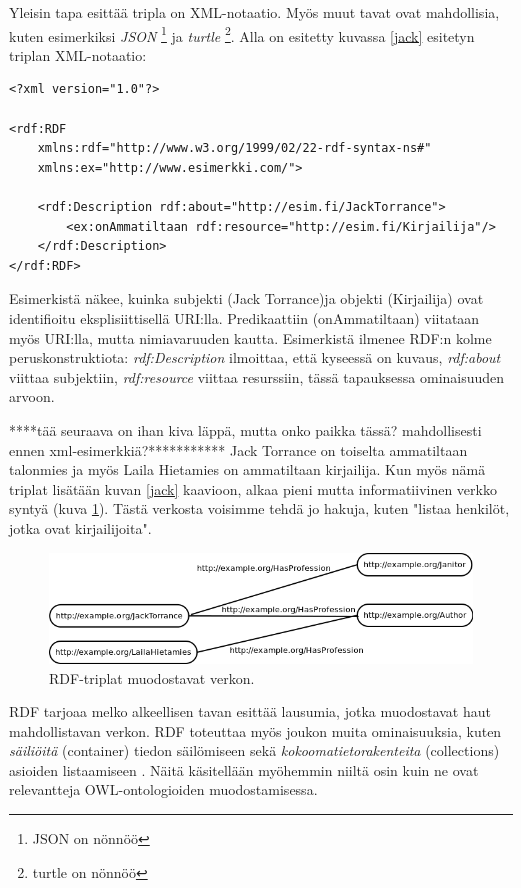 \documentclass[finnish]{tktltiki2}
\theoremstyle{definition}
\theoremstyle{remark}
\begin{document}
Yleisin tapa esittää tripla on XML-notaatio. Myös muut tavat ovat mahdollisia,
kuten 
esimerkiksi \textit{JSON} \footnote{JSON on nönnöö} ja \textit{turtle} \footnote{turtle on nönnöö}. Alla on esitetty kuvassa
\ref{jack} esitetyn triplan XML-notaatio:
\begin{verbatim}
<?xml version="1.0"?>

<rdf:RDF
    xmlns:rdf="http://www.w3.org/1999/02/22-rdf-syntax-ns#"
    xmlns:ex="http://www.esimerkki.com/">
    
    <rdf:Description rdf:about="http://esim.fi/JackTorrance">
        <ex:onAmmatiltaan rdf:resource="http://esim.fi/Kirjailija"/>
    </rdf:Description>
</rdf:RDF>
\end{verbatim}
Esimerkistä näkee, kuinka subjekti (Jack Torrance)ja objekti (Kirjailija) ovat
identifioitu eksplisiittisellä URI:lla. Predikaattiin (onAmmatiltaan) viitataan myös URI:lla, mutta
nimiavaruuden kautta. Esimerkistä ilmenee RDF:n kolme peruskonstruktiota:  
\textit{rdf:Description} ilmoittaa, että kyseessä on kuvaus, \textit{rdf:about} viittaa subjektiin, \textit{rdf:resource}
viittaa resurssiin, tässä tapauksessa ominaisuuden arvoon. 

****tää seuraava on ihan kiva läppä, mutta onko paikka tässä? mahdollisesti ennen xml-esimerkkiä?***********
Jack Torrance on toiselta ammatiltaan talonmies ja myös Laila Hietamies
on ammatiltaan kirjailija. Kun myös nämä triplat lisätään kuvan \ref{jack} kaavioon, alkaa
pieni mutta informatiivinen verkko syntyä (kuva \ref{jack2}). Tästä verkosta voisimme
tehdä jo hakuja, kuten "listaa henkilöt, jotka ovat kirjailijoita".

\begin{figure}[h]
 \centering
 \includegraphics[scale=0.50]{torrance2.png}
 \caption{RDF-triplat muodostavat verkon.}
 \label{jack2}
\end{figure}

RDF tarjoaa melko alkeellisen tavan esittää lausumia, jotka
muodostavat haut mahdollistavan verkon. RDF toteuttaa myös joukon muita ominaisuuksia, kuten
\textit{säiliöitä} (container) tiedon säilömiseen sekä
\textit{kokoomatietorakenteita}
(collections) asioiden listaamiseen \cite{RDFP}. Näitä käsitellään myöhemmin
niiltä osin 
kuin ne ovat relevantteja OWL-ontologioiden muodostamisessa.  
 
\end{document}
